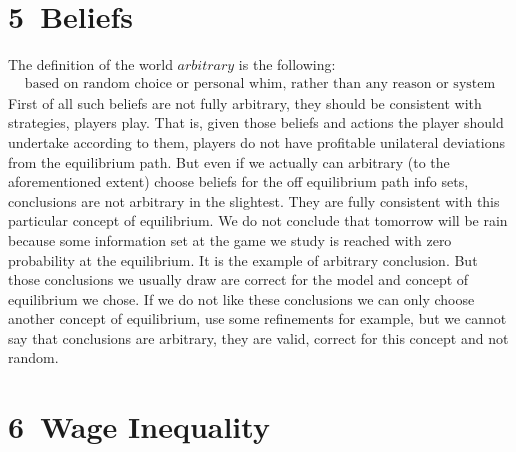 \documentclass[a4paper]{article}
\begin{document}
\section*{5\ Beliefs}
The definition of the world $arbitrary$ is the following:
\begin{align*}
\text{based on random choice or personal whim, rather than any reason or system}
\end{align*}First of all such beliefs are not fully arbitrary, they should be consistent with strategies, players play. That is, given those beliefs and actions the player should undertake according to them, players do not have profitable unilateral deviations from the equilibrium path. But even if we actually can arbitrary (to the aforementioned extent) choose beliefs for the off equilibrium path info sets, conclusions are not arbitrary in the slightest. They are fully consistent with this particular concept of equilibrium. We do not conclude that tomorrow will be rain because some information set at the game we study is reached with zero probability at the equilibrium. It is the example of arbitrary conclusion. But those conclusions we usually draw are correct for the model and concept of equilibrium we chose. If we do not like these conclusions we can only choose another concept of equilibrium, use some refinements for example, but we cannot say that conclusions are arbitrary, they are valid, correct for this concept and not random.
\section*{6\ Wage Inequality}
\end{document}
